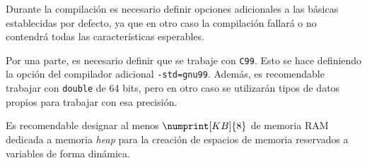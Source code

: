 Durante la compilación es necesario definir opciones adicionales a las básicas
establecidas por defecto, ya que en otro caso la compilación fallará o no contendrá
todas las características esperables.

Por una parte, es necesario definir que se trabaje con \texttt{C99}. Esto se hace
definiendo la opción del compilador adicional \texttt{-std=gnu99}. Además, es recomendable
trabajar con \texttt{double} de 64 bits, pero en otro caso se utilizarán tipos de datos
propios para trabajar con esa precisión.

Es recomendable designar al menos $\numprint[KB]{8}$ de memoria RAM dedicada a memoria
\textit{heap} para la creación de espacios de memoria reservados a variables de
forma dinámica.